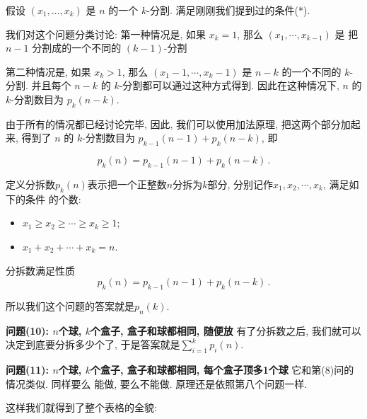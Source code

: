 假设 \((x_1,\ldots,x_k)\) 是 \(n\) 的一个 \(k\)-分割. 满足刚刚我们提到过的条件(*).

我们对这个问题分类讨论: 第一种情况是, 如果 \(x_k = 1\),
那么 \((x_1,\cdots,x_{k-1})\) 是 把\(n-1\) 分割成的一个不同的 \((k-1)\)-分割

第二种情况是, 如果 \(x_k > 1\), 那么 \((x_1-1,\cdots,x_{k}-1)\) 是 \(n-k\) 
的一个不同的 \(k\)-分割. 并且每个 \(n-k\) 的 \(k\)-分割都可以通过这种方式得到. 
因此在这种情况下, \(n\) 的 \(k\)-分割数目为 \(p_k(n-k)\). 

由于所有的情况都已经讨论完毕, 因此, 我们可以使用加法原理, 把这两个部分加起来, 得到了
\(n\) 的 \(k\)-分割数目为 \(p_{k-1}(n-1) + p_k(n-k)\), 即

\[p_k(n)=p_{k-1}(n-1)+p_k(n-k)\,.\]

\begin{definition}[分拆数]
  定义分拆数$p_k(n)$表示把一个正整数$n$分拆为$k$部分, 分别记作$x_1, x_2, \cdots, x_k$, 满足如下的条件
  的个数: 
  \begin{itemize}[noitemsep]
    \item  $x_1\ge x_2\ge\cdots\ge x_k\ge 1$;
    \item $x_1+x_2+\cdots+x_k=n$.
  \end{itemize}
\end{definition}

\begin{theorem}
  分拆数满足性质
  $$p_k(n)=p_{k-1}(n-1)+p_k(n-k)\,.$$
\end{theorem}

所以我们这个问题的答案就是$p_n(k)$. 

\textbf{问题(10): $n$个球, $k$个盒子, 盒子和球都相同, 随便放} 
有了分拆数之后, 我们就可以决定到底要分拆多少个了,  于是答案就是$\sum_{i=1}^{k}p_i(n)$. 

\textbf{问题(11): $n$个球, $k$个盒子, 盒子和球都相同, 每个盒子顶多1个球} 它和第(8)问的情况类似. 同样要么
能做, 要么不能做. 原理还是依照第八个问题一样. 

这样我们就得到了整个表格的全貌: 

